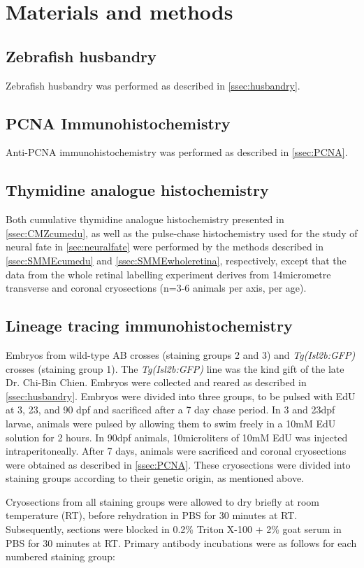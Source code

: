 \section{Materials and methods}
\subsection{Zebrafish husbandry}
Zebrafish husbandry was performed as described in \autoref{ssec:husbandry}.
\subsection{PCNA Immunohistochemistry}
Anti-PCNA immunohistochemistry was performed as described in \autoref{ssec:PCNA}.
\subsection{Thymidine analogue histochemistry}
\label{ssec:CMZEdU}
Both cumulative thymidine analogue histochemistry presented in \autoref{ssec:CMZcumedu}, as well as the pulse-chase histochemistry used for the study of neural fate in \autoref{sec:neuralfate} were performed by the methods described in \autoref{ssec:SMMEcumedu} and \autoref{ssec:SMMEwholeretina}, respectively, except that the data from the whole retinal labelling experiment derives from 14\si{micro}{metre} transverse and coronal cryosections (n=3-6 animals per axis, per age). 

\subsection{Lineage tracing immunohistochemistry}
\label{ssec:CMZlintrace}
Embryos from wild-type AB crosses (staining groups 2 and 3) and \textit{Tg(Isl2b:GFP)} crosses (staining group 1). The \textit{Tg(Isl2b:GFP)} line was the kind gift of the late Dr. Chi-Bin Chien. Embryos were collected and reared as described in \autoref{ssec:husbandry}. Embryos were divided into three groups, to be pulsed with EdU at 3, 23, and 90 dpf and sacrificed after a 7 day chase period. In 3 and 23dpf larvae, animals were pulsed by allowing them to swim freely in a 10mM EdU solution for 2 hours. In 90dpf animals, 10\si{micro}{liters} of 10mM EdU was injected intraperitoneally. After 7 days, animals were sacrificed and coronal cryosections were obtained as described in \autoref{ssec:PCNA}. These cryosections were divided into staining groups according to their genetic origin, as mentioned above.

Cryosections from all staining groups were allowed to dry briefly at room temperature (RT), before rehydration in PBS for 30 minutes at RT.  Subsequently, sections were blocked in 0.2\% Triton X-100 + 2\% goat serum in PBS for 30 minutes at RT. Primary antibody incubations were as follows for each numbered staining group:

